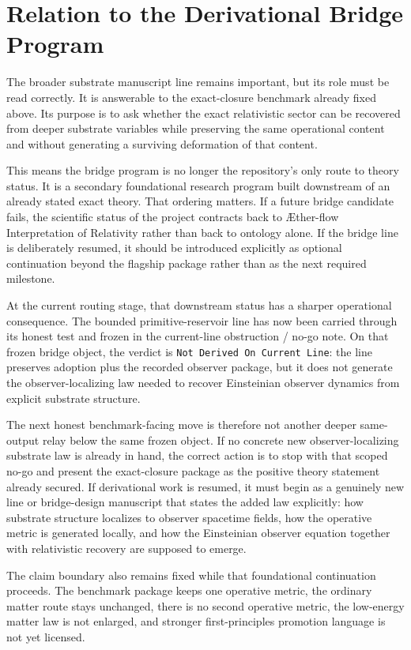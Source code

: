 \documentclass[11pt]{article}
\newcommand{\Aflow}{\AE{}ther-flow}
\newcommand{\TheoryName}{\Aflow{} Interpretation of Relativity}
\begin{document}
\section{Relation to the Derivational Bridge Program}

The broader substrate manuscript line remains important, but its role must be read correctly. It is answerable to the exact-closure benchmark already fixed above. Its purpose is to ask whether the exact relativistic sector can be recovered from deeper substrate variables while preserving the same operational content and without generating a surviving deformation of that content.

This means the bridge program is no longer the repository's only route to theory status. It is a secondary foundational research program built downstream of an already stated exact theory. That ordering matters. If a future bridge candidate fails, the scientific status of the project contracts back to \TheoryName{} rather than back to ontology alone. If the bridge line is deliberately resumed, it should be introduced explicitly as optional continuation beyond the flagship package rather than as the next required milestone.

At the current routing stage, that downstream status has a sharper operational consequence. The bounded primitive-reservoir line has now been carried through its honest test and frozen in the current-line obstruction / no-go note. On that frozen bridge object, the verdict is \texttt{Not Derived On Current Line}: the line preserves adoption plus the recorded observer package, but it does not generate the observer-localizing law needed to recover Einsteinian observer dynamics from explicit substrate structure.

The next honest benchmark-facing move is therefore not another deeper same-output relay below the same frozen object. If no concrete new observer-localizing substrate law is already in hand, the correct action is to stop with that scoped no-go and present the exact-closure package as the positive theory statement already secured. If derivational work is resumed, it must begin as a genuinely new line or bridge-design manuscript that states the added law explicitly: how substrate structure localizes to observer spacetime fields, how the operative metric is generated locally, and how the Einsteinian observer equation together with relativistic recovery are supposed to emerge.

The claim boundary also remains fixed while that foundational continuation proceeds. The benchmark package keeps one operative metric, the ordinary matter route stays unchanged, there is no second operative metric, the low-energy matter law is not enlarged, and stronger first-principles promotion language is not yet licensed.
\end{document}
